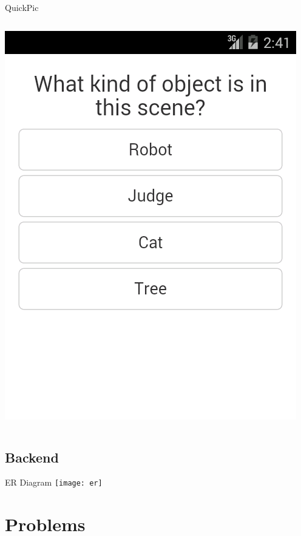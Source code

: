 \documentclass[aspectratio=169]{beamer}
\begin{document}
\begin{frame}{QuickPic}
\begin{columns}[c]
\begin{column}{0.5\columnwidth}
      \includegraphics[width=\textwidth,height=\textheight,keepaspectratio]{ss_quickpic_options}
    \end{column}
  \end{columns}
\end{frame}

\subsection{Backend}

\begin{frame}{ER Diagram}
  \centering
  \texttt{[image: er]}
\end{frame}

\section{Problems}

\end{document}
